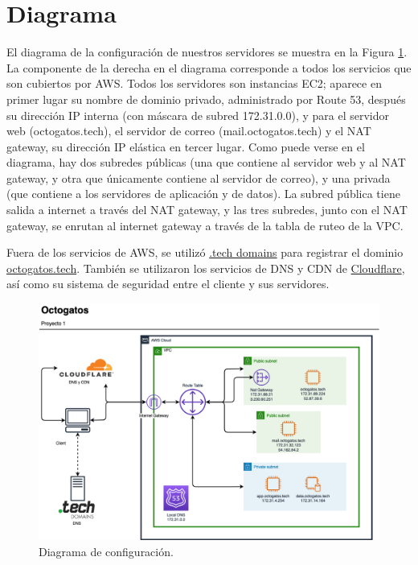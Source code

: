 \documentclass{article}
\begin{document}

\section{Diagrama}
\label{sec:diagrama}

El diagrama de la configuraci\'on de nuestros
servidores se muestra en la Figura \ref{fig:diagrama}.
La componente de la derecha en el diagrama corresponde
a todos los servicios que son cubiertos por AWS.
Todos los servidores son instancias EC2; aparece en
primer lugar su nombre de dominio privado, administrado
por Route 53, despu\'es su direcci\'on IP interna (con
m\'ascara de subred 172.31.0.0), y para el servidor web
(octogatos.tech), el servidor de correo
(mail.octogatos.tech) y el NAT gateway, su direcci\'on
IP el\'astica en tercer lugar.   Como puede verse en
el diagrama, hay dos subredes p\'ublicas (una que
contiene al servidor web y al NAT gateway, y otra que
\'unicamente contiene al servidor de correo), y una
privada (que contiene a los servidores de aplicaci\'on
y de datos).   La subred p\'ublica tiene salida a
internet a trav\'es del NAT gateway, y las tres
subredes, junto con el NAT gateway, se enrutan al
internet gateway a trav\'es de la tabla de ruteo de
la VPC.

Fuera de los servicios de AWS, se utiliz\'o
\href{https://get.tech}{.tech domains} para registrar
el dominio \href{https://octogatos.tech}{octogatos.tech}.
Tambi\'en se utilizaron los servicios de DNS y CDN de
\href{https://cloudflare.com}{Cloudflare}, as\'i como
su sistema de seguridad entre el cliente y sus
servidores.

\begin{figure}[H]
  \centering
  \includegraphics[width=\textwidth]{images/diagrama}
  \caption{Diagrama de configuraci\'on.}
  \label{fig:diagrama}
\end{figure}
\end{document}
